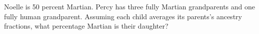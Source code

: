 Noelle is 50 percent Martian. Percy has three fully Martian grandparents and one fully human grandparent. Assuming each child averages its parents's ancestry fractions, what percentage Martian is their daughter?
